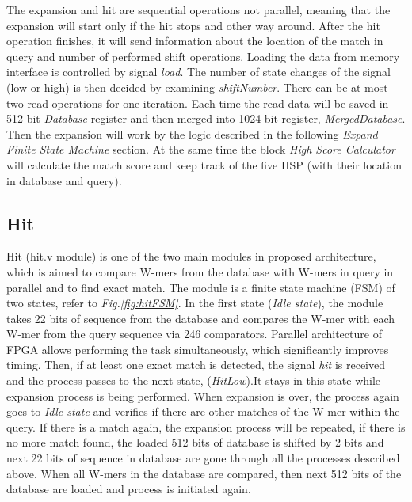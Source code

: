 The expansion and hit are sequential operations not parallel, meaning that the expansion will start only if the hit stops and other way around. After the hit operation finishes, it will send information about the location of the match in query and number of performed shift operations. Loading the data from memory interface is controlled by signal \textit{load}. The number of state changes of the signal (low or high) is then decided by examining \textit{shiftNumber}. There can be at most two read operations for one iteration. Each time the read data will be saved in 512-bit \textit{Database} register and then merged into 1024-bit register, \textit{MergedDatabase}. Then the expansion will work by the logic described in the following \textit{Expand Finite State Machine} section. 
At the same time the block \textit{High Score Calculator} will calculate the match score and keep track of the five HSP (with their location in database and query).    



\subsection{Hit}
\quad Hit (hit.v module) is one of the two main modules in proposed architecture, which is aimed to compare W-mers from the database with W-mers in query in parallel and to find exact match. The module is a finite state machine (FSM) of two states, refer to \textit{Fig.\ref{fig:hitFSM}}. In the first state (\textit{Idle state}), the module takes 22 bits of sequence from the database and compares the W-mer with each W-mer from the query sequence via 246 comparators. Parallel architecture of FPGA allows performing the task simultaneously, which significantly improves timing. Then, if at least one exact match is detected, the signal \textit{hit} is received and the process passes to the next state, (\textit{HitLow}).It stays in this state while expansion process is being performed. When expansion is over, the process again goes to \textit{Idle state} and verifies if there are other matches of the W-mer within the query. If there is a match again, the expansion process will be repeated, if there is no more match found, the loaded 512 bits of database is shifted by 2 bits and next 22 bits of sequence in database are gone through all the processes described above. When all W-mers in the database are compared, then next 512 bits of the database are loaded and process is initiated again. 

